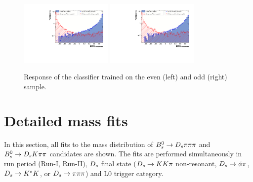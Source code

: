 \begin{figure}[h]
\centering
\includegraphics[height=!,width=0.4\textwidth]{figs/TMVA/BDTG_Data_run1_t0_even/overtrain_BDTG.pdf}
\includegraphics[height=!,width=0.4\textwidth]{figs/TMVA/BDTG_Data_run1_t0_odd/overtrain_BDTG.pdf}
\caption{Response of the classifier trained on the even (left) and odd (right) sample.}
\label{fig:}
\end{figure}


\clearpage
\section{Detailed mass fits}
\label{sec:DetailedMassfits}

In this section, all fits to the mass distribution of ${{B}^0_{s}}\rightarrow{\ensuremath{{D}_{s}}}{\ensuremath{\pi}}{\ensuremath{\pi}}{\ensuremath{\pi}}$ and ${{B}^0_{s}}\rightarrow{\ensuremath{{D}_{s}}}{\ensuremath{K}}{\ensuremath{\pi}}{\ensuremath{\pi}}$ candidates are shown. 
The fits are performed simultaneously 
in run period (Run-I, Run-II), 
${{D}_{s}}$ final state  (${{D}_{s}}\rightarrow{\ensuremath{K}}{\ensuremath{K}}{\ensuremath{\pi}}$ non-resonant, ${{D}_{s}}\rightarrow\phi\pi$, ${{D}_{s}}\rightarrow{\ensuremath{{K}^*}}{\ensuremath{K}}$, or ${{D}_{s}}\rightarrow{\ensuremath{\pi}}{\ensuremath{\pi}}{\ensuremath{\pi}}$) 
and \textsf{L0} trigger category. 

